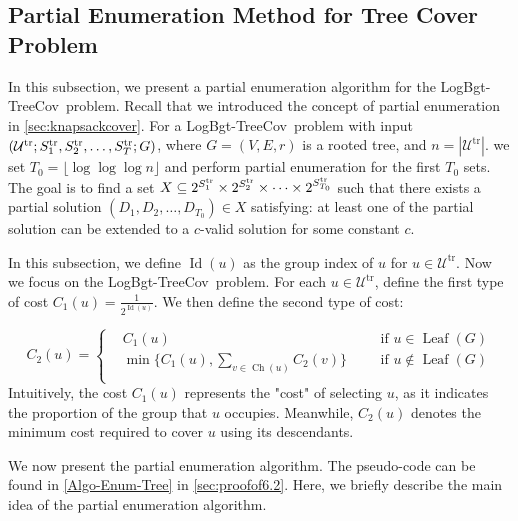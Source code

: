 \documentclass[11pt,a4paper]{article} \usepackage{enumitem}
\newcommand{\calU}{\mathcal{U}}
\newcommand{\LBOtreecov}{\textsf{LogBgt-TreeCov}}
\newcommand{\trU}{\operatorname{\calU^{tr}}}
\newcommand{\trS}[1]{\ifx\relax#1\relax
    S^{\operatorname{tr}} \else
    S^{\operatorname{tr}}_{#1} \fi
}
\newcommand{\Ch}{\operatorname{Ch}}
\newcommand{\Leaf}{\operatorname{Leaf}}
\newcommand{\Lev}{\operatorname{Id}}
\theoremstyle{definition}
\begin{document}
\subsection{Partial Enumeration Method for Tree Cover Problem}
\label{sec:Inter-Cover-2}

In this subsection, we present a partial enumeration algorithm for 
the \LBOtreecov\ problem.
Recall that we introduced the concept of partial enumeration in \cref{sec:knapsackcover}. For a \LBOtreecov\ problem with input $(\trU;\trS{1},\trS{2},\ldots,\trS{T};G)$, where $G=(V,E,r)$ is a rooted tree, and $n=|\trU|$. 
we set $T_0 = \lfloor \log \log \log n \rfloor$ and perform partial enumeration for the first $T_0$ sets. The goal is to find a set $X \subseteq 2^{\trS{1}} \times 2^{\trS{2}} \times \dots \times 2^{\trS{T_0}}$ such that there exists a partial solution $(D_1, D_2, \dots, D_{T_0}) \in X$ satisfying: at least one of 
the partial solution can be extended to a $c$-valid solution for some constant $c$.

In this subsection, we define $\Lev(u)$ as the group index of $u$ for $u\in \trU$.
Now we focus on the \LBOtreecov\ problem. 
For each $u \in \trU$, define the first type of cost $C_1(u) = \frac{1}{2^{\Lev(u)}}$. We then define the second type of cost:

$$
C_2(u)=\left\lbrace \begin{aligned}
&C_1(u) && & \text{if $u\in \Leaf(G)$}\\
&\min \lbrace C_1(u),\sum_{v\in \Ch(u)} C_2(v)\rbrace&& & \text{if $u\not \in \Leaf(G)$}\\
\end{aligned}\right.
$$
Intuitively, the cost $C_1(u)$ represents the "cost" of selecting $u$, as it indicates the proportion of the group that $u$ occupies.
Meanwhile, $C_2(u)$ denotes the minimum cost required to cover $u$ using its descendants.


We now present the partial enumeration algorithm. The pseudo-code can be found in \cref{Algo-Enum-Tree} in \cref{sec:proofof6.2}. Here, we briefly describe the main idea of the partial enumeration algorithm.
\end{document}
